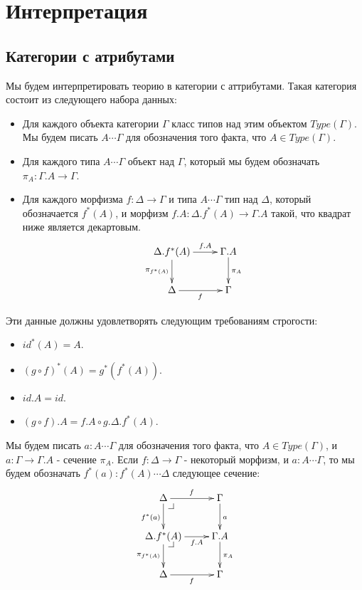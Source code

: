 \documentclass{amsart}
\makeatletter
\theoremstyle{definition}
\theoremstyle{remark}
\newcommand{\pb}[1][dr]{\save*!/#1-1.2pc/#1:(-1,1)@^{|-}\restore}
\numberwithin{figure}{section}
\makeatother
\begin{document}
\newpage

\section{Интерпретация}

\subsection{Категории с атрибутами}

Мы будем интерпретировать теорию в категории с аттрибутами.
Такая категория состоит из следующего набора данных:
\begin{itemize}
\item Для каждого объекта категории $\Gamma$ класс типов над этим объектом $Type(\Gamma)$.
    Мы будем писать $A \dotsb \Gamma$ для обозначения того факта, что $A \in Type(\Gamma)$.
\item Для каждого типа $A \dotsb \Gamma$ объект над $\Gamma$, который мы будем обозначать $\pi_A : \Gamma.A \to \Gamma$.
\item Для каждого морфизма $f : \Delta \to \Gamma$ и типа $A \dotsb \Gamma$ тип над $\Delta$, который обозначается $f^*(A)$,
    и морфизм $f.A : \Delta.f^*(A) \to \Gamma.A$ такой, что квадрат ниже является декартовым.
\[ \xymatrix{ \Delta.f^*(A) \ar[d]_{\pi_{f^*(A)}} \ar[r]^-{f.A} & \Gamma.A \ar[d]^{\pi_A} \\
              \Delta \ar[r]_f & \Gamma
            } \]
\end{itemize}

Эти данные должны удовлетворять следующим требованиям строгости:
\begin{itemize}
\item $id^*(A) = A$.
\item $(g \circ f)^*(A) = g^*(f^*(A))$.
\item $id.A = id$.
\item $(g \circ f).A = f.A \circ g.\Delta.f^*(A)$.
\end{itemize}

Мы будем писать $a : A \dotsb \Gamma$ для обозначения того факта, что $A \in Type(\Gamma)$, и $a : \Gamma \to \Gamma.A$ - сечение $\pi_A$.
Если $f : \Delta \to \Gamma$ - некоторый морфизм, и $a : A \dotsb \Gamma$, то мы будем обозначать $f^*(a) : f^*(A) \dotsb \Delta$ следующее сечение:
\[ \xymatrix{ \Delta \ar[r]^f \ar[d]_{f^*(a)} \pb                   & \Gamma \ar[d]^a \\
              \Delta.f^*(A) \ar[r]_-{f.A} \ar[d]_{\pi_{f^*(A)}} \pb & \Gamma.A \ar[d]^{\pi_A} \\
              \Delta \ar[r]_f                                       & \Gamma
                 }\]
\end{document}
